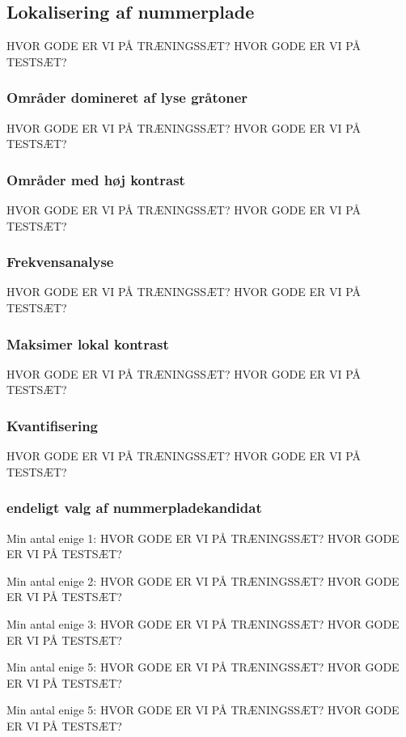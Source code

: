 \subsection{Lokalisering af nummerplade}
HVOR GODE ER VI PÅ TRÆNINGSSÆT?
HVOR GODE ER VI PÅ TESTSÆT?

\subsubsection{Områder domineret af lyse gråtoner}
HVOR GODE ER VI PÅ TRÆNINGSSÆT?
HVOR GODE ER VI PÅ TESTSÆT?

\subsubsection{Områder med høj kontrast}
HVOR GODE ER VI PÅ TRÆNINGSSÆT?
HVOR GODE ER VI PÅ TESTSÆT?

\subsubsection{Frekvensanalyse}
HVOR GODE ER VI PÅ TRÆNINGSSÆT?
HVOR GODE ER VI PÅ TESTSÆT?

\subsubsection{Maksimer lokal kontrast}
HVOR GODE ER VI PÅ TRÆNINGSSÆT?
HVOR GODE ER VI PÅ TESTSÆT?

\subsubsection{Kvantifisering}
HVOR GODE ER VI PÅ TRÆNINGSSÆT?
HVOR GODE ER VI PÅ TESTSÆT?

\subsubsection{endeligt valg af nummerpladekandidat}

Min antal enige 1:
HVOR GODE ER VI PÅ TRÆNINGSSÆT?
HVOR GODE ER VI PÅ TESTSÆT?


Min antal enige 2:
HVOR GODE ER VI PÅ TRÆNINGSSÆT?
HVOR GODE ER VI PÅ TESTSÆT?

Min antal enige 3:
HVOR GODE ER VI PÅ TRÆNINGSSÆT?
HVOR GODE ER VI PÅ TESTSÆT?

Min antal enige 5:
HVOR GODE ER VI PÅ TRÆNINGSSÆT?
HVOR GODE ER VI PÅ TESTSÆT?

Min antal enige 5:
HVOR GODE ER VI PÅ TRÆNINGSSÆT?
HVOR GODE ER VI PÅ TESTSÆT?


